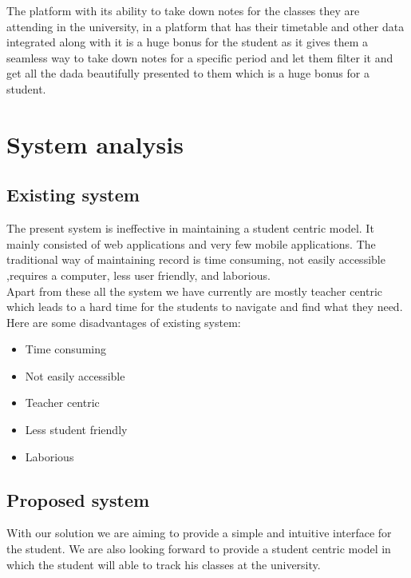 \documentclass{article}
\begin{document}
\vspace{1em}
\Large
The platform with its ability to take down notes for the classes they are attending in the university, in a platform that has their timetable and other data integrated along with it is a huge bonus for the student as it gives them a seamless way to take down notes for a specific period and let them filter it and get all the dada beautifully presented to them which is a huge bonus for a student.

\newpage


\newpage

\section{System analysis}
\hspace{1em}

\subsection{Existing system}

\Large
The present system is ineffective in maintaining a student centric model. It mainly consisted of web applications and very few mobile applications. The traditional way of maintaining record is time consuming, not easily accessible ,requires a computer, less user friendly, and laborious.\\

\Large
Apart from these all the system we have currently are mostly teacher centric which leads to a hard time for the students to navigate and find what they need.\\

\Large
Here are some disadvantages of existing system:
\begin{itemize}
\item Time consuming
\item Not easily accessible
\item Teacher centric
\item Less student friendly
\item Laborious
\end{itemize}

\vspace{1em}

\subsection{Proposed system}

\Large
With our solution we are aiming to provide a simple and intuitive interface for the student. We are also looking forward to provide a student centric model in which the student will able to track his classes at the university.\\
\end{document}
